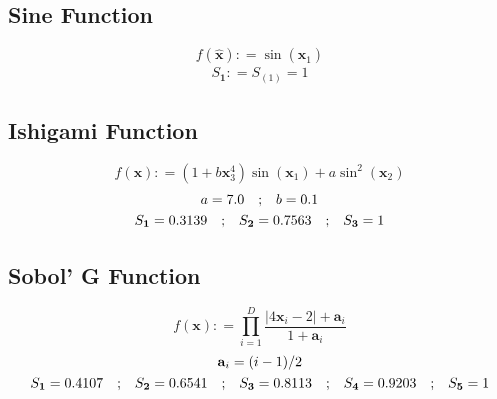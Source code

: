 \documentclass[preprint,12pt]{elsarticle}
\newcommand*{\M}[1]{\ensuremath{#1}\xspace}
\newcommand*{\vr}[1]{\M{\mathbf{#1}}}
\newcommand*{\deq}{\M{\mathrel{\mathop:}=}}
\newcommand{\T}[1]{\text{#1}}
\newcommand*{\QT}[2][]{\M{\quad\T{#2}\ifthenelse{\equal{#1}{}}{\quad}{#1}}}
\newcommand*{\modulus}[1]{\M{\left\lvert#1\right\rvert}}
\begin{document}
        \subsection{Sine Function} \label{sub:Results:Sin}
            \begin{equation} \label{def:Sin}
                f(\vr{\hat{x}}) \deq \sin(\vr{\hat{x}}_1)
            \end{equation}
            \begin{gather*}
                S_{\vr{1}} \deq S_{(1)} = 1
            \end{gather*}




        \subsection{Ishigami Function} \label{sub:Results:Ishigami}
            \begin{equation} \label{def:Ishigami}
                f(\vr{x}) \deq \left(1 + b \vr{x}_3^4\right) \sin(\vr{x}_1) + a \sin^{2}(\vr{x}_2)
            \end{equation}
            \begin{gather*}
                a = 7.0 \QT{;} b = 0.1 \\
                S_{\vr{1}} = 0.3139 \QT{;}S_{\vr{2}} = 0.7563 \QT{;} S_{\vr{3}} = 1
            \end{gather*}

            


        \subsection{Sobol' G Function} \label{sub:Results:SobolG}
            \begin{equation} \label{def:SobolG}
                f(\vr{x}) \deq \prod_{i=1}^{D}{\frac{\modulus{4\vr{x}_i - 2} + \vr{a}_{i}}{1+\vr{a}_{i}}}
            \end{equation}
            \begin{gather*}
                \vr{a}_{i} = (i-1)/2 \\
                S_{\vr{1}} = 0.4107 \QT{;}S_{\vr{2}} = 0.6541 \QT{;} S_{\vr{3}} = 0.8113 \QT{;} S_{\vr{4}} = 0.9203 \QT{;} S_{\vr{5}} = 1
            \end{gather*}
\end{document}
